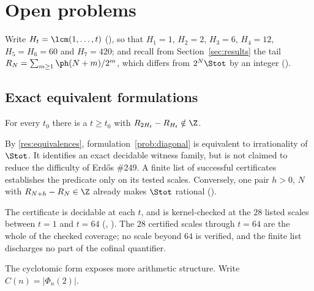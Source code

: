 \section{Open problems}\label{sec:frontier}

Write $H_t=\lcm(1,\dots,t)$
(),
so that $H_1=1$, $H_2=2$, $H_3=6$, $H_4=12$, $H_5=H_6=60$ and $H_7=420$; and
recall from Section~\ref{sec:results} the tail
$R_N=\sum_{m\ge1}\ph(N+m)/2^{m}$, which differs from $2^N\Stot$ by an integer
().

\subsection{Exact equivalent formulations}

\begin{equivform}\label{prob:diagonal}
For every $t_0$ there is a $t\ge t_0$ with $R_{2H_t}-R_{H_t}\notin\Z$.
\end{equivform}

\noindent By \ref{res:equivalences}, formulation~\ref{prob:diagonal} is
equivalent to irrationality of $\Stot$.  It identifies an exact decidable
witness family, but is not claimed to reduce the difficulty of Erd\H{o}s
\#249.  A finite list of successful certificates establishes the predicate
only on its tested scales.  Conversely, one pair $h>0$, $N$ with
$R_{N+h}-R_N\in\Z$ already makes $\Stot$ rational
().

The certificate is decidable at each $t$, and is kernel-checked at the $28$
listed scales between $t=1$ and $t=64$
(,
).
The $28$ certified scales through $t=64$ are the whole of the checked
coverage; no scale beyond $64$ is verified, and the finite list discharges no
part of the cofinal quantifier.

The cyclotomic form exposes more arithmetic structure.  Write
$C(n)=|\Phi_n(2)|$.

